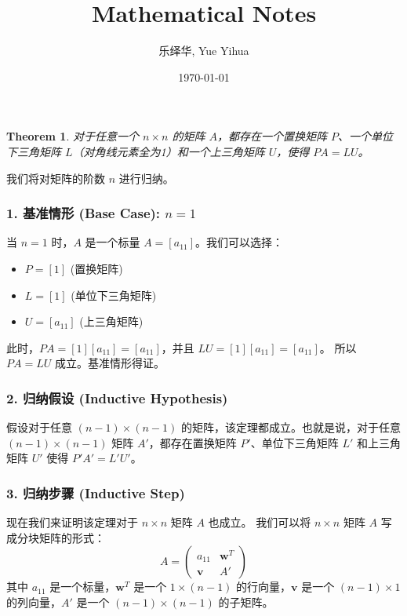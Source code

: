 \documentclass{amsart}
\author{乐绎华, Yue Yihua}
\date{\today}
\title{Mathematical Notes}
\theoremstyle{plain}
\newtheorem{theorem}{Theorem}[section]
\theoremstyle{definition}
\theoremstyle{remark}
\begin{document}
\maketitle
\tableofcontents

\begin{theorem}
对于任意一个 $n \times n$ 的矩阵 $A$，都存在一个置换矩阵 $P$、一个单位下三角矩阵 $L$（对角线元素全为1）和一个上三角矩阵 $U$，使得 $PA = LU$。
\end{theorem}
我们将对矩阵的阶数 $n$ 进行归纳。

\subsubsection{1. 基准情形 (Base Case): \texorpdfstring{$n=1$}{n=1}}

当 $n=1$ 时，$A$ 是一个标量 $A=[a_{11}]$。我们可以选择：

\begin{itemize}
	\item $P = [1]$ (置换矩阵)
	\item $L = [1]$ (单位下三角矩阵)
	\item $U = [a_{11}]$ (上三角矩阵)
\end{itemize}

此时，$PA = [1][a_{11}] = [a_{11}]$，并且 $LU = [1][a_{11}] = [a_{11}]$。
所以 $PA=LU$ 成立。基准情形得证。

\subsubsection{2. 归纳假设 (Inductive Hypothesis)}

假设对于任意 $(n-1) \times (n-1)$ 的矩阵，该定理都成立。也就是说，对于任意 $(n-1) \times (n-1)$ 矩阵 $A'$，都存在置换矩阵 $P'$、单位下三角矩阵 $L'$ 和上三角矩阵 $U'$ 使得 $P'A' = L'U'$。

\subsubsection{3. 归纳步骤 (Inductive Step)}

现在我们来证明该定理对于 $n \times n$ 矩阵 $A$ 也成立。
我们可以将 $n \times n$ 矩阵 $A$ 写成分块矩阵的形式：
\[
A = \begin{pmatrix} a_{11} & \mathbf{w}^T \\ \mathbf{v} & A' \end{pmatrix}
\]
其中 $a_{11}$ 是一个标量，$\mathbf{w}^T$ 是一个 $1 \times (n-1)$ 的行向量，$\mathbf{v}$ 是一个 $(n-1) \times 1$ 的列向量，$A'$ 是一个 $(n-1) \times (n-1)$ 的子矩阵。
\end{document}
